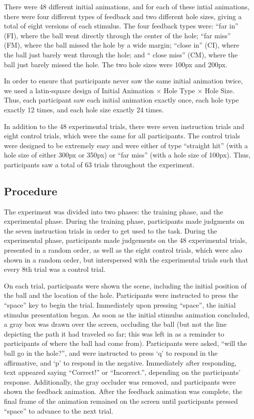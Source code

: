 \documentclass[10pt,letterpaper]{article}
\begin{document}
There were 48 different initial animations, and for each of these intial animations, there were four different types of feedback and two different hole sizes, giving a total of eight versions of each stimulus. The four feedback types were: ``far in'' (FI), where the ball went directly through the center of the hole; ``far miss'' (FM), where the ball missed the hole by a wide margin; ``close in'' (CI), where the ball just barely went through the hole; and `` close miss'' (CM), where the ball just barely missed the hole. The two hole sizes were 100px and 200px.

In order to ensure that participants never saw the same initial animation twice, we used a latin-square design of Initial Animation $\times$ Hole Type $\times$ Hole Size. Thus, each participant saw each initial animation exactly once, each hole type exactly 12 times, and each hole size exactly 24 times.

In addition to the 48 experimental trials, there were seven instruction trials and eight control trials, which were the same for all participants. The control trials were designed to be extremely easy and were either of type ``straight hit'' (with a hole size of either 300px or 350px) or ``far miss'' (with a hole size of 100px). Thus, participants saw a total of 63 trials throughout the experiment.

\subsection{Procedure}

The experiment was divided into two phases: the training phase, and the experimental phase. During the training phase, participants made judgments on the seven instruction trials in order to get used to the task. During the experimental phase, participants made judgements on the 48 experimental trials, presented in a random order, as well as the eight control trials, which were also shown in a random order, but interspersed with the experimental trials such that every 8th trial was a control trial.

On each trial, participants were shown the scene, including the initial position of the ball and the location of the hole. Participants were instructed to press the ``space'' key to begin the trial. Immediately upon pressing ``space'', the initial stimulus presentation began. As soon as the initial stimulus animation concluded, a gray box was drawn over the screen, occluding the ball (but not the line depicting the path it had traveled so far; this was left in as a reminder to participants of where the ball had come from). Participants were asked, ``will the ball go in the hole?'', and were instructed to press `q' to respond in the affirmative, and `p' to respond in the negative. Immediately after responding, text appeared saying ``Correct!'' or ``Incorrect.'', depending on the participants' response. Additionally, the gray occluder was removed, and participants were shown the feedback animation. After the feedback animation was complete, the final frame of the animation remained on the screen until participants pressed ``space'' to advance to the next trial. 
\end{document}
